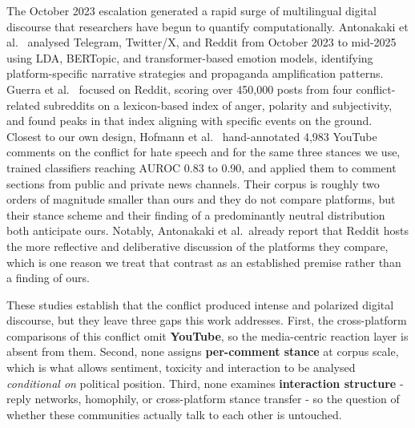 The October 2023 escalation generated a rapid surge of multilingual digital
discourse that researchers have begun to quantify computationally. Antonakaki
et al.~\cite{antonakaki2025} analysed Telegram, Twitter/X, and Reddit from October
2023 to mid-2025 using LDA, BERTopic, and transformer-based emotion models,
identifying platform-specific narrative strategies and propaganda amplification
patterns. Guerra et al.~\cite{guerra2025} focused on Reddit, scoring over
450{,}000 posts from four conflict-related subreddits on a lexicon-based index of
anger, polarity and subjectivity, and found peaks in that index aligning with
specific events on the ground. Closest
to our own design, Hofmann et al.~\cite{hofmann2026} hand-annotated 4{,}983
YouTube comments on the conflict for hate speech and for the same three stances
we use, trained classifiers reaching AUROC 0.83 to 0.90, and applied them to
comment sections from public and private news channels. Their corpus is roughly
two orders of magnitude smaller than ours and they do not compare platforms, but
their stance scheme and their finding of a predominantly neutral distribution
both anticipate ours. Notably, Antonakaki et al.\ already report that Reddit
hosts the more reflective and deliberative discussion of the platforms they
compare, which is one reason we treat that contrast as an established premise
rather than a finding of ours.

These studies establish that the conflict produced intense and polarized digital
discourse, but they leave three gaps this work addresses. First, the
cross-platform comparisons of this conflict omit \textbf{YouTube}, so the
media-centric reaction layer is absent from them. Second, none assigns
\textbf{per-comment stance} at corpus scale, which is what allows sentiment, toxicity
and interaction to be analysed \emph{conditional on} political position. Third, none
examines \textbf{interaction structure} - reply networks, homophily, or
cross-platform stance transfer - so the question of whether these communities
actually talk to each other is untouched.

